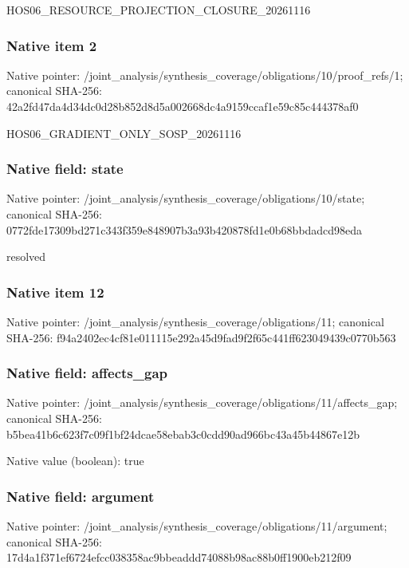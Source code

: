 \documentclass[10pt,a4paper]{article}
\begin{document}
\begingroup\raggedright\sloppy HOS06\_\allowbreak{}RESOURCE\_\allowbreak{}PROJECTION\_\allowbreak{}CLOSURE\_\allowbreak{}20261116\par\endgroup

\subsubsection{Native item 2}
Native pointer: /joint\_\allowbreak{}analysis/synthesis\_\allowbreak{}coverage/obligations/10/proof\_\allowbreak{}refs/1; canonical SHA-256: 42a2fd47da4d34dc0d28b852d8d5a002668dc4a9159ccaf1e59c85c444378af0

\begingroup\raggedright\sloppy HOS06\_\allowbreak{}GRADIENT\_\allowbreak{}ONLY\_\allowbreak{}SOSP\_\allowbreak{}20261116\par\endgroup

\subsubsection{Native field: state}
Native pointer: /joint\_\allowbreak{}analysis/synthesis\_\allowbreak{}coverage/obligations/10/state; canonical SHA-256: 0772fde17309bd271c343f359e848907b3a93b420878fd1e0b68bbdadcd98eda

\begingroup\raggedright\sloppy resolved\par\endgroup

\subsubsection{Native item 12}
Native pointer: /joint\_\allowbreak{}analysis/synthesis\_\allowbreak{}coverage/obligations/11; canonical SHA-256: f94a2402ec4cf81e011115e292a45d9fad9f2f65c441ff623049439c0770b563

\subsubsection{Native field: affects\_\allowbreak{}gap}
Native pointer: /joint\_\allowbreak{}analysis/synthesis\_\allowbreak{}coverage/obligations/11/affects\_\allowbreak{}gap; canonical SHA-256: b5bea41b6c623f7c09f1bf24dcae58ebab3c0cdd90ad966bc43a45b44867e12b

Native value (boolean): true

\subsubsection{Native field: argument}
Native pointer: /joint\_\allowbreak{}analysis/synthesis\_\allowbreak{}coverage/obligations/11/argument; canonical SHA-256: 17d4a1f371ef6724efcc038358ac9bbeaddd74088b98ac88b0ff1900eb212f09
\end{document}
